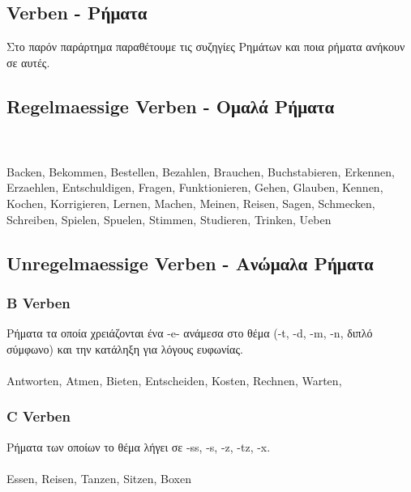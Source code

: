
\begin{appendix}
 
 \section{Verben - Ρήματα}
 
 Στο παρόν παράρτημα παραθέτουμε τις συζηγίες Ρημάτων και ποια ρήματα ανήκουν σε αυτές.
 
 \subsection{Regelmaessige Verben - Ομαλά Ρήματα}
 
  \\ 
  \\
 
 \gls{Backen}, \gls{Bekommen}, \gls{Bestellen}, \gls{Bezahlen}, \gls{Brauchen}, \gls{Buchstabieren}, \gls{Erkennen}, \gls{Erzaehlen}, \gls{Entschuldigen}, \gls{Fragen}, \gls{Funktionieren}, \gls{Gehen}, \gls{Glauben}, \gls{Kennen}, \gls{Kochen}, \gls{Korrigieren}, \gls{Lernen}, \gls{Machen}, \gls{Meinen}, \gls{Reisen}, \gls{Sagen}, \gls{Schmecken}, \gls{Schreiben}, \gls{Spielen}, \gls{Spuelen}, \gls{Stimmen}, \gls{Studieren}, \gls{Trinken}, \gls{Ueben}
 
 \subsection{Unregelmaessige Verben - Ανώμαλα Ρήματα}
 
 \subsubsection{B Verben}
 Ρήματα τα οποία χρειάζονται ένα -e- ανάμεσα στο θέμα (-t, -d, -m, -n, διπλό σύμφωνο) και την κατάληξη για λόγους ευφωνίας. \\ \newline
  \\ \newline
 \gls{Antworten}, \gls{Atmen}, \gls{Bieten}, \gls{Entscheiden}, \gls{Kosten}, \gls{Rechnen}, \gls{Warten}, 
 
 \subsubsection{C Verben}
 Ρήματα των οποίων το θέμα λήγει σε -ss, -s, -z, -tz, -x. \\
  \\ \newline
 \gls{Essen}, \gls{Reisen}, \gls{Tanzen}, \gls{Sitzen}, \gls{Boxen}

\end{appendix}
